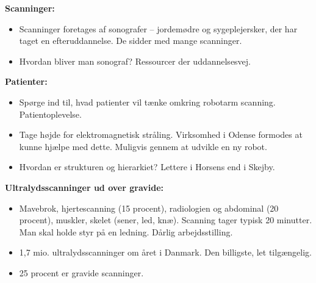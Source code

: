 \textbf{Scanninger:}
\begin{itemize}
\item Scanninger foretages af sonografer – jordemødre og sygeplejersker, der har taget en efteruddannelse. De sidder med mange scanninger. 
\item Hvordan bliver man sonograf? Ressourcer der uddannelsesvej.
\end{itemize}
\textbf{Patienter:}
\begin{itemize}
\item Spørge ind til, hvad patienter vil tænke omkring robotarm scanning. Patientoplevelse.
\item Tage højde for elektromagnetisk stråling. Virksomhed i Odense formodes at kunne hjælpe med dette. Muligvis gennem at udvikle en ny robot. 
\item Hvordan er strukturen og hierarkiet? Lettere i Horsens end i Skejby.
\end{itemize}
\textbf{Ultralydsscanninger ud over gravide:}
\begin{itemize}
\item Mavebrok, hjertescanning (15 procent), radiologien og abdominal (20 procent), muskler, skelet (sener, led, knæ). Scanning tager typisk 20 minutter. Man skal holde styr på en ledning. Dårlig arbejdsstilling. 
\item 1,7 mio. ultralydsscanninger om året i Danmark. Den billigste, let tilgængelig. 
\item 25 procent er gravide scanninger.
\end{itemize}

\newpage